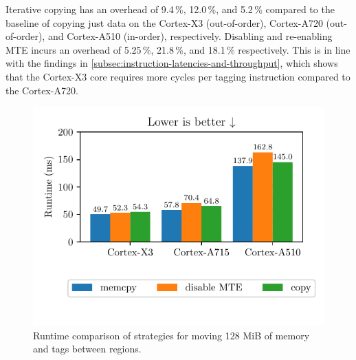 \noindent
Iterative copying has an overhead of 9.4\,\%, 12.0\,\%, and 5.2\,\% compared to the baseline of copying just data on the Cortex-X3 (out-of-order), Cortex-A720 (out-of-order), and Cortex-A510 (in-order), respectively.
Disabling and re-enabling \ac{MTE} incurs an overhead of 5.25\,\%, 21.8\,\%, and 18.1\,\% respectively.
This is in line with the findings in \cref{subsec:instruction-latencies-and-throughput}, which shows that the Cortex-X3 core requires more cycles per tagging instruction compared to the Cortex-A720.

\begin{figure}[h]
    \centering
    \includegraphics{plots/migrate}
    \caption{Runtime comparison of strategies for moving 128 MiB of memory and tags between regions.}
    \label{fig:migrate-performance}
\end{figure}
